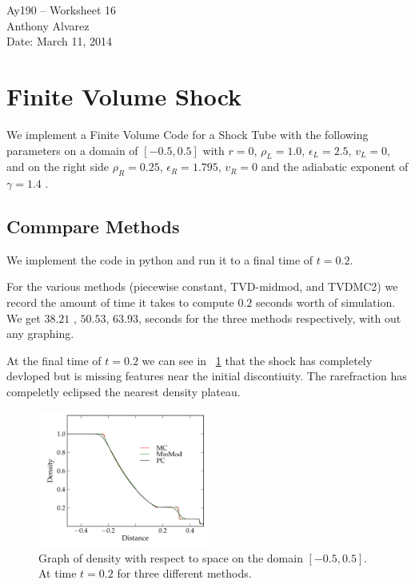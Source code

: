 \documentclass[11pt,letterpaper]{article}
\begin{document}
\begin{center}
\Large
Ay190 -- Worksheet 16\\
Anthony Alvarez\\
Date: March 11, 2014
\end{center}

\section{Finite Volume Shock}

We implement a Finite Volume Code for a Shock Tube with the following parameters on a 
domain of $[-0.5,0.5]$ with
$r= 0$, $\rho_L = 1.0$, $\epsilon_L = 2.5$, $v_L = 0$, and on the right side
$\rho_R = 0.25$, $\epsilon_R = 1.795$, $v_R= 0$ and the adiabatic exponent of 
$\gamma = 1.4$ .

\subsection{Commpare Methods}

We implement the code in python and run it to a final time of $t = 0.2$. 

For the various methods (piecewise constant, TVD-midmod, and TVDMC2) we record
the amount of time it takes to compute $0.2$ seconds worth of simulation. We get
$38.21$ , $50.53$, $63.93$, seconds for the three methods respectively, with out
any graphing.

At the final time of $t=0.2$ we can see in  ~\ref{fig:0} that the 
shock has completely devloped but is missing features near the initial 
discontiuity. The rarefraction has compeletly eclipsed the nearest density
plateau.

\begin{figure}[bth]
\centering
\includegraphics[width=0.5\textwidth]{Compare Finite Volume.pdf}
\caption{Graph of density with respect to space on the domain 
$[-0.5,0.5]$. At time $t = 0.2$ for three different methods.}
\label{fig:0}
\end{figure}
\end{document}
